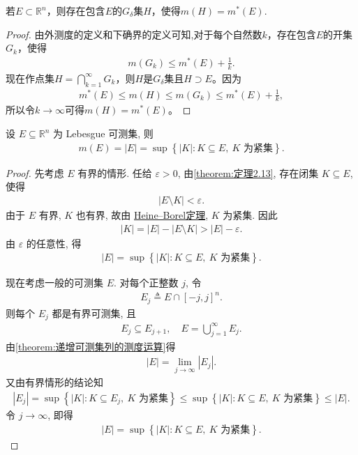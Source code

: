 \documentclass[../../main.tex]{subfiles}%
\begin{document}
\begin{theorem}[外测度的正则性]\label{theorem:外测度的正则性}
若\(E \subset \mathbb{R}^n\)，则存在包含\(E\)的\(G_\delta\)集\(H\)，使得\(m(H)=m^*(E)\).
\end{theorem}
\begin{proof}
由外测度的定义和下确界的定义可知,对于每个自然数\(k\)，存在包含\(E\)的开集\(G_k\)，使得
\begin{align*}
m(G_k) \leqslant m^*(E) + \frac{1}{k}.
\end{align*}
现在作点集\(H = \bigcap_{k = 1}^{\infty}G_k\)，则\(H\)是\(G_\delta\)集且\(H \supset E\)。因为
\begin{align*}
m^*(E) \leqslant m(H) \leqslant m(G_k) \leqslant m^*(E) + \frac{1}{k},
\end{align*}
所以令$k\to \infty$可得\(m(H)=m^*(E)\)。
\end{proof}

\begin{theorem}[Lebesgue测度的内正则性]\label{theorem:Lebesgue测度的内正则性}
设 $E\subseteq\mathbb{R}^n$ 为 Lebesgue 可测集, 则
\begin{align*}
m(E)=|E|
=
\sup\left\{
|K|:K\subseteq E,\ K\text{ 为紧集}
\right\}.
\end{align*} 
\end{theorem}
\begin{proof}

先考虑 $E$ 有界的情形. 任给 $\varepsilon>0$,
由\cref{theorem:定理2.13},
存在闭集 $K\subseteq E$, 使得
\begin{align*}
|E\setminus K|<\varepsilon.
\end{align*}
由于 $E$ 有界, $K$ 也有界, 故由 \hyperref[theorem:Heine - Borel有限子覆盖定理]{Heine--Borel定理},
$K$ 为紧集. 因此
\begin{align*}
|K|
=|E|-|E\setminus K|
>|E|-\varepsilon.
\end{align*}
由 $\varepsilon$ 的任意性, 得
\begin{align*}
|E|
=\sup\left\{
|K|:K\subseteq E,\ K\text{ 为紧集}
\right\}.
\end{align*}

现在考虑一般的可测集 $E$. 对每个正整数 $j$, 令
\begin{align*}
E_j\triangleq E\cap[-j,j]^n.
\end{align*}
则每个 $E_j$ 都是有界可测集, 且
\begin{align*}
E_j\subseteq E_{j+1},
\quad
E=\bigcup\limits_{j=1}^{\infty}E_j.
\end{align*}
由\cref{theorem:递增可测集列的测度运算}得
\begin{align*}
|E|=\lim_{j\to\infty}|E_j|.
\end{align*}
又由有界情形的结论知
\begin{align*}
|E_j|
=\sup\left\{
|K|:K\subseteq E_j,\ K\text{ 为紧集}
\right\}\leqslant
\sup\left\{
|K|:K\subseteq E,\ K\text{ 为紧集}
\right\}
\leqslant |E|.
\end{align*}
令 $j\to\infty$, 即得
\begin{align*}
|E|
=\sup\left\{
|K|:K\subseteq E,\ K\text{ 为紧集}
\right\}.
\end{align*}
\end{proof}
\end{document}
